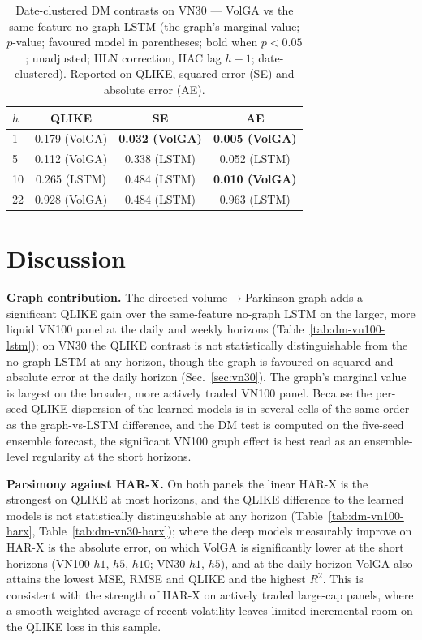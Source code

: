 \documentclass[runningheads]{llncs}
\begin{document}
\begin{table}[t]
\centering
\caption{Date-clustered DM contrasts on VN30 --- VolGA vs the same-feature no-graph LSTM (the graph's
marginal value; $p$-value; favoured model in parentheses; bold when $p<0.05$; unadjusted; HLN
correction, HAC lag $h{-}1$; date-clustered). Reported on QLIKE, squared error (SE) and absolute
error (AE).}
\label{tab:dm-vn30-lstm}
\footnotesize
\setlength{\tabcolsep}{8pt}
\begin{tabular}{lccc}
\toprule
$h$ & QLIKE & SE & AE \\
\midrule
1  & 0.179 (VolGA) & \textbf{0.032 (VolGA)} & \textbf{0.005 (VolGA)} \\
5  & 0.112 (VolGA) & 0.338 (LSTM)           & 0.052 (LSTM) \\
10 & 0.265 (LSTM)  & 0.484 (LSTM)           & \textbf{0.010 (VolGA)} \\
22 & 0.928 (VolGA) & 0.484 (LSTM)           & 0.963 (LSTM) \\
\bottomrule
\end{tabular}
\end{table}

\FloatBarrier
\section{Discussion}\label{sec:disc}
\textbf{Graph contribution.} The directed volume$\to$Parkinson graph adds a significant QLIKE gain
over the same-feature no-graph LSTM on the larger, more liquid VN100 panel at the daily and weekly
horizons (Table~\ref{tab:dm-vn100-lstm}); on VN30 the QLIKE contrast is not statistically
distinguishable from the no-graph LSTM at any horizon, though the graph is favoured on squared and
absolute error at the daily horizon (Sec.~\ref{sec:vn30}). The graph's marginal value is largest on
the broader, more actively traded VN100 panel. Because the per-seed QLIKE dispersion of the learned
models is in several cells of the same order as the graph-vs-LSTM difference, and the DM test is
computed on the five-seed ensemble forecast, the significant VN100 graph effect is best read as an
ensemble-level regularity at the short horizons.

\textbf{Parsimony against HAR-X.} On both panels the linear HAR-X is the strongest on QLIKE at most
horizons, and the QLIKE difference to the learned models is not statistically distinguishable at any
horizon (Table~\ref{tab:dm-vn100-harx}, Table~\ref{tab:dm-vn30-harx}); where the deep models
measurably improve on HAR-X is the absolute error, on which VolGA is significantly lower at the short
horizons (VN100 $h1$, $h5$, $h10$; VN30 $h1$, $h5$), and at the daily horizon VolGA also attains the
lowest MSE, RMSE and QLIKE and the highest $R^2$. This is consistent with the strength of HAR-X on
actively traded large-cap panels, where a smooth weighted average of recent volatility leaves limited
incremental room on the QLIKE loss in this sample.
\end{document}
